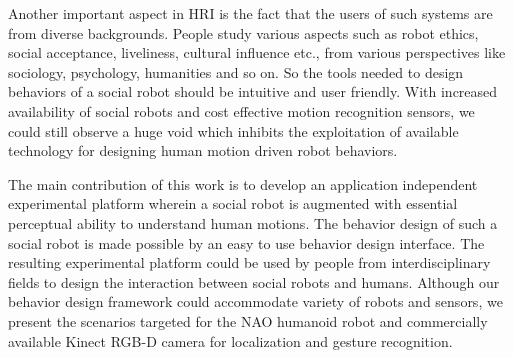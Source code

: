 \documentclass{llncs}
\begin{document}
%
	Another important aspect in HRI is the fact that the users of such systems are from diverse backgrounds. People study various aspects such as robot ethics, social acceptance, liveliness, cultural influence etc., from various perspectives like sociology, psychology, humanities and so on. So the tools needed to design behaviors of a social robot should be intuitive and user friendly.  With increased availability of social robots and cost effective motion recognition sensors, we could still observe a huge void which inhibits the exploitation of available technology for designing human motion driven robot behaviors.

	The main contribution of this work is to develop an application independent experimental platform wherein a social robot is augmented with essential perceptual ability to understand human motions. The behavior design of such a social robot is made possible by an easy to use behavior design interface. The resulting experimental platform could be used by people from interdisciplinary fields to design the interaction between social robots and humans. Although our behavior design framework could accommodate variety of robots and sensors, we present the scenarios targeted for the NAO \cite{NaoRobot} humanoid robot and commercially available Kinect \cite{Kinect2014} RGB-D camera for localization and gesture recognition. 
\end{document}
